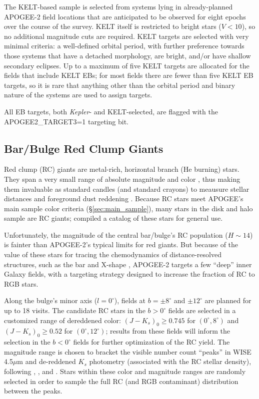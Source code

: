 \documentclass[12pt,twocolumn]{emulateapj}
\begin{document}
The KELT-based sample is selected from systems lying
in already-planned APOGEE-2 field locations that are anticipated to be observed for eight epochs over the course of the survey. KELT itself is restricted to bright stars ($V<10$), so no additional magnitude cuts are required. 
KELT targets are selected with very minimal criteria: a well-defined orbital period, with further preference towards those systems that have a detached morphology, are bright, and/or have shallow secondary eclipses.  Up to a maximum of five KELT targets are allocated for the fields that include KELT EBs; for most fields there are fewer than five KELT EB targets, so it is rare that anything other than the orbital period and binary nature of the systems are used to assign targets.

All EB targets, both {\it Kepler}- and KELT-selected, are flagged with the APOGEE2\_TARGET3=1 targeting bit.


\subsection{Bar/Bulge Red Clump Giants}
\label{sec:bulge_rc}

Red clump (RC) giants are metal-rich, horizontal branch (He burning) stars.  They span a very small range of absolute magnitude and color \citep[e.g.,][]{Girardi_2001_RCabsmag}, thus making them invaluable as standard candles (and standard crayons) to meausure stellar distances and foreground dust reddening \citep[e.g.,][]{Stanek_1997_RCbar,Benjamin_05_glimpse,Nataf_2013_bulgeextlaw}.  Because RC stars meet APOGEE's main sample color criteria (\S\ref{sec:main_sample}), many stars in the disk and halo sample are RC giants; \citet{Bovy_2014_APOGEE_RC_catalog} compiled a catalog of these stars for general use.

Unfortunately, the magnitude of the central bar/bulge's RC population ($H \sim 14$) is fainter than APOGEE-2's typical limits for red giants.  But because of the value of these stars for tracing the chemodynamics of distance-resolved structures, such as the bar and X-shape \citep[e.g.,][]{McWilliam_10_xshapedbulge,Nataf_2010_dualbulgeRC,Wegg_2013_RCbulge}, APOGEE-2 targets a few ``deep'' inner Galaxy fields, with a targeting strategy designed to increase the fraction of RC to RGB stars.  

Along the bulge's minor axis ($l=0^\circ$), fields at $b=\pm 8^\circ$ and $\pm12^\circ$ are planned for up to 18 visits.  The candidate RC stars in the $b>0^\circ$ fields are selected in a customized range of dereddened color: $(J-K_s)_0 \geq 0.745$ for $(0^\circ,8^\circ)$ and $(J-K_s)_0 \geq 0.52$ for $(0^\circ,12^\circ)$; results from these fields will inform the selection in the $b<0^\circ$ fields for further optimization of the RC yield. The magnitude range is chosen to bracket the visible number count ``peaks'' in  WISE 4.5$\mu$m and de-reddened $K_s$ photometry (associated with the RC stellar density), following \citet{Benjamin_05_glimpse}, \citet{Zasowski_2012_innerMW}, and \citet{Wegg_2013_RCbulge}.  Stars within these color and magnitude ranges are randomly selected in order to sample the full RC (and RGB contaminant) distribution between the peaks.
\end{document}
